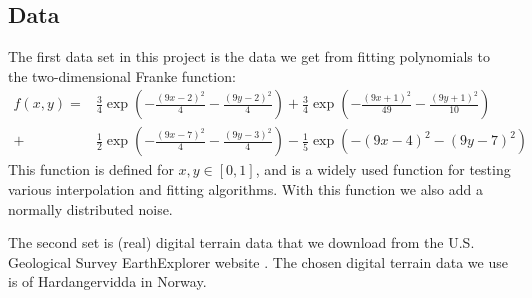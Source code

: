 \documentclass[12pt,a4paper,english]{article}
\begin{document}
\subsection{Data}
The first data set in this project is the data we get from fitting polynomials to the two-dimensional Franke function:
\begin{align}
\label{eq:Franke_func}
f(x,y)=&\frac{3}{4}\exp\left(-\frac{(9x-2)^2}{4}-\frac{(9y-2)^2}{4}\right)+
\frac{3}{4}\exp\left(-\frac{(9x+1)^2}{49}-\frac{(9y+1)^2}{10}\right)\\ 
+& \frac{1}{2}\exp\left(-\frac{(9x-7)^2}{4}-\frac{(9y-3)^2}{4}\right)- \frac{1}{5}\exp\left(-(9x-4)^2-(9y-7)^2\right) \nonumber
\end{align}
This function is defined for $x,y\in[0,1]$, and is a widely used function for testing various interpolation and fitting algorithms. With this function we also add a normally distributed noise.

The second set is (real) digital terrain data that we download from the
U.S. Geological Survey EarthExplorer website \cite{earthexplorer}. The chosen digital terrain data we use is of Hardangervidda in Norway.
\end{document}
